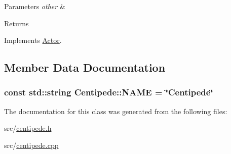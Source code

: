 \begin{DoxyParams}{Parameters}
{\em other} & \\
\hline
\end{DoxyParams}
\begin{DoxyReturn}{Returns}

\end{DoxyReturn}


Implements \hyperlink{classActor_a1595ffb3d753120a9e74eac0bd69adf1}{Actor}.



\subsection{Member Data Documentation}
\subsubsection[{\texorpdfstring{N\+A\+ME}{NAME}}]{\setlength{\rightskip}{0pt plus 5cm}const std\+::string Centipede\+::\+N\+A\+ME = \char`\"{}Centipede\char`\"{}\hspace{0.3cm}{\ttfamily [static]}}\hypertarget{classCentipede_a9eb91c34048cb51599b5c3bcac6dfa64}{}\label{classCentipede_a9eb91c34048cb51599b5c3bcac6dfa64}


The documentation for this class was generated from the following files\+:\begin{DoxyCompactItemize}
\item 
src/\hyperlink{centipede_8h}{centipede.\+h}\item 
src/\hyperlink{centipede_8cpp}{centipede.\+cpp}\end{DoxyCompactItemize}
